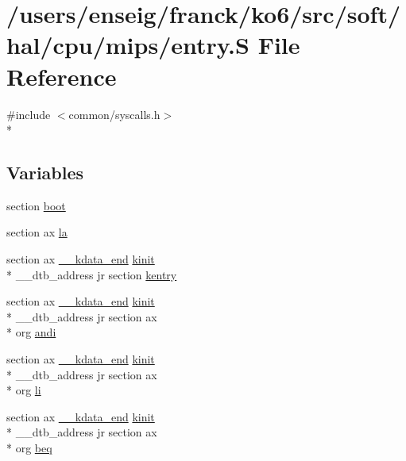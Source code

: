 \hypertarget{mips_2entry_8S}{\section{/users/enseig/franck/ko6/src/soft/hal/cpu/mips/entry.S File Reference}
\label{mips_2entry_8S}
}
{\ttfamily \#include $<$common/syscalls.\-h$>$}\\*
\subsection*{Variables}
\begin{DoxyCompactItemize}
\item 
section \hyperlink{mips_2entry_8S_a337fb5bad1df922a0879d51e6c2c399c}{boot}
\item 
section ax \hyperlink{mips_2entry_8S_a834b90b9918d03bb7f429b845f72164a}{la}
\item 
section ax \hyperlink{kmemory_8c_a869ed24619b20d01d0f6c457c069ec96}{\-\_\-\-\_\-kdata\-\_\-end} \hyperlink{kinit_8c_a7316311400d5b710f1b974a353b10d1c}{kinit} \\*
\-\_\-\-\_\-dtb\-\_\-address jr section \hyperlink{mips_2entry_8S_a7f1cfe80f85e2f1bd9103b0960e09009}{kentry}
\item 
section ax \hyperlink{kmemory_8c_a869ed24619b20d01d0f6c457c069ec96}{\-\_\-\-\_\-kdata\-\_\-end} \hyperlink{kinit_8c_a7316311400d5b710f1b974a353b10d1c}{kinit} \\*
\-\_\-\-\_\-dtb\-\_\-address jr section ax \\*
org \hyperlink{mips_2entry_8S_a1d8aee1caeac6c96721f7c6296321af9}{andi}
\item 
section ax \hyperlink{kmemory_8c_a869ed24619b20d01d0f6c457c069ec96}{\-\_\-\-\_\-kdata\-\_\-end} \hyperlink{kinit_8c_a7316311400d5b710f1b974a353b10d1c}{kinit} \\*
\-\_\-\-\_\-dtb\-\_\-address jr section ax \\*
org \hyperlink{mips_2entry_8S_a4aae0b089c5269a564bd882bfc76d8de}{li}
\item 
section ax \hyperlink{kmemory_8c_a869ed24619b20d01d0f6c457c069ec96}{\-\_\-\-\_\-kdata\-\_\-end} \hyperlink{kinit_8c_a7316311400d5b710f1b974a353b10d1c}{kinit} \\*
\-\_\-\-\_\-dtb\-\_\-address jr section ax \\*
org \hyperlink{mips_2entry_8S_a744f7a335784b23d045867be1a1a37a5}{beq}
\item 

\end{DoxyCompactItemize}
